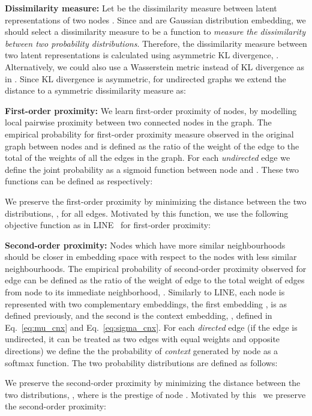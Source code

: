 \documentclass[runningheads]{llncs}
\begin{document}
\textbf{Dissimilarity measure:} Let  be the dissimilarity measure between latent representations of two nodes . 
Since  and  are Gaussian distribution embedding, we should select a dissimilarity measure to be a function to \textit{measure the dissimilarity between two probability distributions}. 
Therefore, the dissimilarity measure between two latent representations is calculated using asymmetric KL divergence, .
Alternatively, we could also use a Wasserstein metric instead of KL divergence as in \cite{DBLP:vne}.
Since KL divergence is asymmetric, for undirected graphs we extend the distance to a symmetric dissimilarity measure as:
\useshortskip


\textbf{First-order proximity:} We learn first-order proximity of nodes, by modelling local pairwise proximity between two connected nodes in the graph. The empirical probability for first-order proximity measure observed in the original graph between nodes  and  is defined as the ratio of the weight of the edge  to the total of the weights of all the edges in the graph. For each \textit{undirected} edge  we define the joint probability as a sigmoid function between node  and . These two functions can be defined as respectively:
\useshortskip

We preserve the first-order proximity by minimizing the distance between the two distributions, , for all edges. Motivated by this function, we use the following objective function as in LINE~\cite{DBLP:line} for first-order proximity:
\useshortskip

 
\textbf{Second-order proximity:}
Nodes which have more similar neighbourhoods should be closer in embedding space with respect to the nodes with less similar neighbourhoods. The empirical probability of second-order proximity observed for edge  can be defined as the ratio of the weight of edge  to the total weight of edges from node  to its immediate neighborhood, . Similarly to LINE, each node is represented with two complementary embeddings, the first embedding , is as defined previously, and the second is the context embedding, , defined in Eq.~\ref{eq:mu_cnx} and Eq.~\ref{eq:sigma_cnx}. For each \textit{directed} edge  (if the edge is undirected, it can be treated as two edges with equal weights and opposite directions) we define the the probability of \textit{context}  generated by node  as a softmax function. The two probability distributions are defined as follows:
\useshortskip

We preserve the second-order proximity by minimizing the distance between the two distributions, , where  is the prestige of node . Motivated by this~\cite{DBLP:line} we preserve the second-order proximity:
\useshortskip
\end{document}
